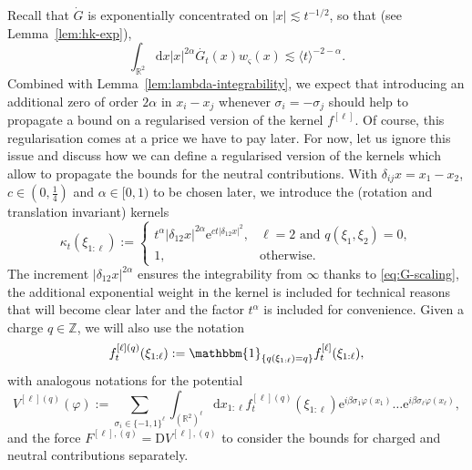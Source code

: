 \documentclass[11pt, a4paper]{scrartcl}
\numberwithin{equation}{section}
\theoremstyle{plain}
\theoremstyle{remark}
\newcommand{\assign}{:=}
\newcommand{\mathD}{\mathrm{D}}
\newcommand{\mathd}{\mathrm{d}}
\newcommand{\mathe}{\mathrm{e}}
\begin{document}
Recall that $\dot{G}$ is exponentially concentrated on $| x | \lesssim t^{- 1
			/ 2}$, so that (see Lemma~\ref{lem:hk-exp}),
\begin{equation}
	\int_{\mathbb{R}^2} \mathd x | x |^{2 \alpha} \dot{G_t} (x) w_{\varsigma}
	(x) \lesssim \langle t \rangle^{- 2 - \alpha} . \label{eq:G-scaling}
\end{equation}
Combined with Lemma~\ref{lem:lambda-integrability}, we expect that introducing
an additional zero of order $2 \alpha$ in $x_i - x_j$ whenever $\sigma_i = -
	\sigma_j$ should help to propagate a bound on a regularised version of the
kernel $f^{[\ell]}$. Of course, this regularisation comes at a price we have
to pay later. For now, let us ignore this issue and discuss how we can define
a regularised version of the kernels which allow to propagate the bounds for
the neutral contributions. With $\delta_{i j} x = x_1 - x_2$, $c \in \left( 0,
	\frac{1}{4} \right)$ and $\alpha \in [0, 1)$ to be chosen later, we introduce
the (rotation and translation invariant) kernels
\begin{equation}
	\kappa_t (\xi_{1 : \ell}) \assign \begin{cases}
		t^{\alpha} | \delta_{12} x |^{2 \alpha} \mathe^{ct | \delta_{12} x |^2}, &
		\ell = 2 \text{ and } q (\xi_1, \xi_2) = 0,                                                  \\
		1,                                                                       & \text{otherwise.}
	\end{cases} \label{eq:def-k}
\end{equation}
The increment $| \delta_{12} x |^{2 \alpha}$ ensures the integrability from
$\infty$ thanks to \eqref{eq:G-scaling}, the additional exponential weight in
the kernel is included for technical reasons that will become clear later and
the factor $t^{\alpha}$ is included for convenience. Given a charge $q \in
	\mathbb{Z}$, we will also use the notation
\begin{equation}
	f^{[\ell] (q)}_t (\xi_{1 : \ell}) \assign \mathbbm{1}_{\{ q (\xi_{1 : \ell})
			= q \}} f^{[\ell]}_t (\xi_{1 : \ell}), \label{eq:def-f0}
\end{equation}
with analogous notations for the potential
\begin{equation}
	V^{[\ell] (q)} (\varphi) \assign \sum_{\sigma_i \in \{ - 1, 1 \}^{\ell}}
	\int_{(\mathbb{R}^2)^{\ell}} \mathd x_{1 : \ell} f_t^{[\ell] (q)} (\xi_{1 :
		\ell}) \mathe^{i \beta \sigma_1 \varphi (x_1)} \ldots \mathe^{i \beta
		\sigma_{\ell} \varphi (x_{\ell})}, \label{eq:def-f0-2}
\end{equation}
and the force $F^{[\ell], (q)} = \mathD V^{[\ell], (q)}$ to consider the
bounds for charged and neutral contributions separately.
\end{document}

